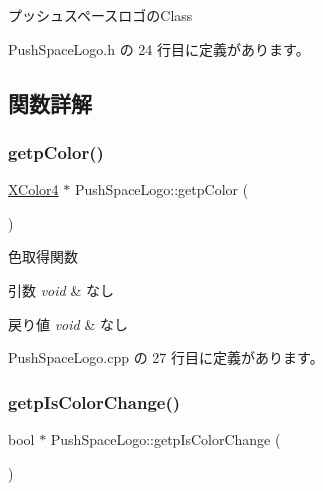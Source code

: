 プッシュスペースロゴの\+Class 

 Push\+Space\+Logo.\+h の 24 行目に定義があります。



\subsection{関数詳解}
\mbox{\label{class_push_space_logo_acdba863f2625454c1138dd0d79f90100}} 
\subsubsection{\texorpdfstring{getp\+Color()}{getpColor()}}
{\footnotesize\ttfamily \mbox{\hyperlink{_vector3_d_8h_a680c30c4a07d86fe763c7e01169cd6cc}{X\+Color4}} $\ast$ Push\+Space\+Logo\+::getp\+Color (\begin{DoxyParamCaption}{ }\end{DoxyParamCaption})}



色取得関数 


\begin{DoxyParams}{引数}
{\em void} & なし \\
\hline
\end{DoxyParams}

\begin{DoxyRetVals}{戻り値}
{\em void} & なし \\
\hline
\end{DoxyRetVals}


 Push\+Space\+Logo.\+cpp の 27 行目に定義があります。

\mbox{\label{class_push_space_logo_ab61b852053e1ab953a34925f1aee3af1}} 
\subsubsection{\texorpdfstring{getp\+Is\+Color\+Change()}{getpIsColorChange()}}
{\footnotesize\ttfamily bool $\ast$ Push\+Space\+Logo\+::getp\+Is\+Color\+Change (\begin{DoxyParamCaption}{ }\end{DoxyParamCaption})}



